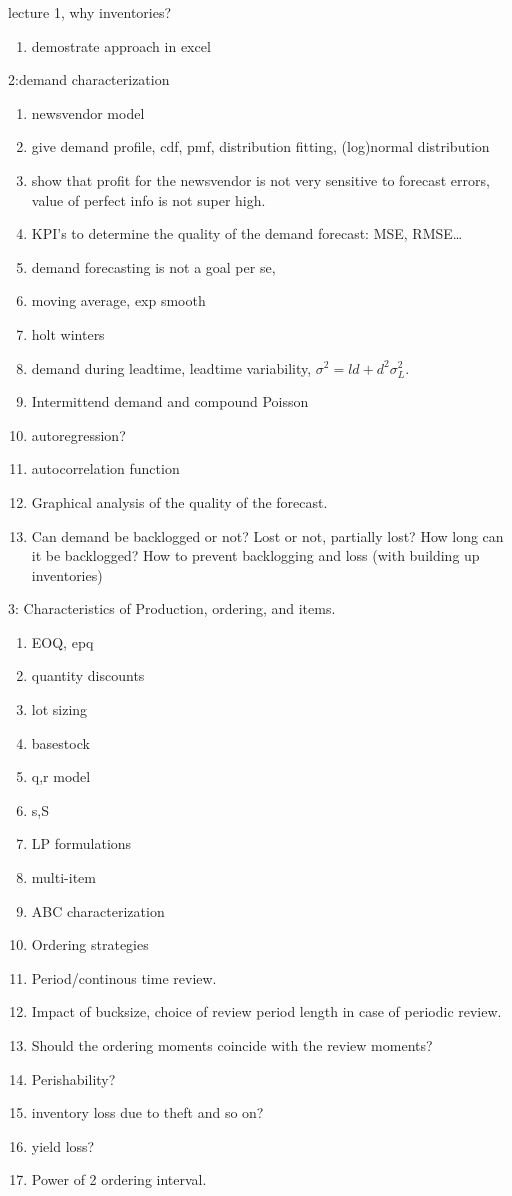 lecture 1, why inventories?

\begin{enumerate}
\item demostrate approach in excel
\end{enumerate}

2:demand characterization
\begin{enumerate}
\item newsvendor model
\item give demand profile, cdf, pmf, distribution fitting, (log)normal distribution
\item show that profit for the newsvendor is not very sensitive to
  forecast errors, value of perfect info is not super high. 
\item KPI's to determine the quality of the demand forecast: MSE, RMSE\ldots
\item demand forecasting is not a goal per se,
\item moving average, exp smooth
\item holt winters
\item demand during leadtime, leadtime variability, $\sigma^2 = l d + d^2 \sigma_L^2$.
\item Intermittend demand and compound Poisson
\item autoregression?
\item autocorrelation function
\item Graphical analysis of the quality of the forecast.
\item Can demand be backlogged or not? Lost or not, partially lost?
  How long can it be backlogged? How to prevent backlogging and loss
  (with building up inventories)
\end{enumerate}

3: Characteristics of Production, ordering, and items.
\begin{enumerate}
\item EOQ, epq
\item quantity discounts
\item lot sizing
\item basestock
\item q,r model
\item s,S 
\item LP formulations
\item multi-item
\item ABC characterization
\item Ordering strategies
\item Period/continous time review.
\item Impact of bucksize, choice of review period length in case of periodic review.
\item Should the ordering moments coincide with the review moments?
\item Perishability? 
\item inventory loss due to theft and so on?
\item yield loss?
\item Power of 2 ordering interval.
\end{enumerate}

